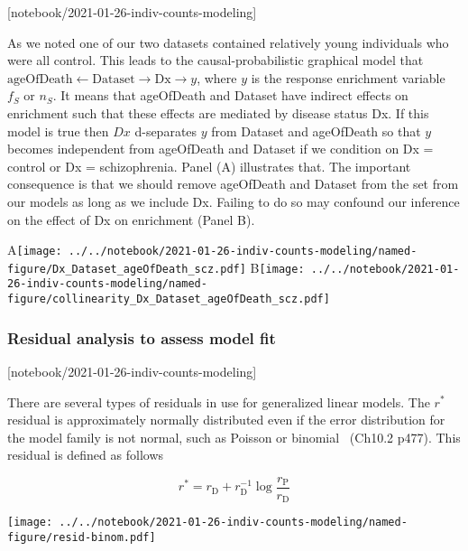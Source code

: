 \documentclass[letterpaper]{article}
\begin{document}
[notebook/2021-01-26-indiv-counts-modeling]

As we noted one of our two datasets contained relatively young individuals who
were all control.  This leads to the causal-probabilistic graphical model that
\(\mathrm{ageOfDeath} \leftarrow \mathrm{Dataset} \rightarrow \mathrm{Dx}
	\rightarrow y\)\), where \(y\) is the response enrichment variable
\(f_S\) or \(n_S\).  It means that ageOfDeath and
Dataset have indirect effects on enrichment such that these effects are
mediated by disease status Dx. If this model is true then \(Dx\) d-separates
\(y\) from Dataset and ageOfDeath so that \(y\) becomes independent from
ageOfDeath and Dataset if we condition on Dx = control or Dx =
schizophrenia.  Panel (A) illustrates that.  The important consequence is
that we should remove ageOfDeath and Dataset from the set from our models as long
as we include Dx.  Failing to do so may confound our
inference on the effect of Dx on enrichment (Panel B).

A\texttt{[image: ../../notebook/2021-01-26-indiv-counts-modeling/named-figure/Dx\_Dataset\_ageOfDeath\_scz.pdf]}
B\texttt{[image: ../../notebook/2021-01-26-indiv-counts-modeling/named-figure/collinearity\_Dx\_Dataset\_ageOfDeath\_scz.pdf]}

\subsubsection*{Residual analysis to assess model fit }

[notebook/2021-01-26-indiv-counts-modeling]

There are several types of residuals in use for generalized linear models.
The $r^\ast$ residual is approximately normally distributed even if the error
distribution for the model family is not normal, such as Poisson or
binomial~\citep{davison2003statistical} (Ch10.2 p477).
This residual is defined as follows

$$
r^\ast = r_\mathrm{D} + r_\mathrm{D}^{-1} \log
\frac{r_\mathrm{P}}{r_\mathrm{D}}
$$

\texttt{[image: ../../notebook/2021-01-26-indiv-counts-modeling/named-figure/resid-binom.pdf]}
\end{document}
